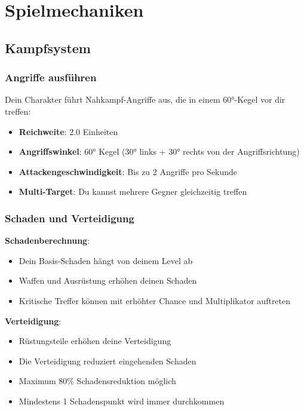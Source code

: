 \documentclass[
  a4paper,
  11pt,
  ngerman,
  parskip=half,
  bibliography=totoc,
  listof=totoc
]{scrreprt}
\begin{document}

\chapter{Spielmechaniken}

\section{Kampfsystem}

\subsection{Angriffe ausführen}

Dein Charakter führt Nahkampf-Angriffe aus, die in einem 60°-Kegel vor dir treffen:

\begin{itemize}
    \item \textbf{Reichweite}: 2.0 Einheiten
    \item \textbf{Angriffswinkel}: 60° Kegel (30° links + 30° rechts von der Angriffsrichtung)
    \item \textbf{Attackengeschwindigkeit}: Bis zu 2 Angriffe pro Sekunde
    \item \textbf{Multi-Target}: Du kannst mehrere Gegner gleichzeitig treffen
\end{itemize}

\subsection{Schaden und Verteidigung}

\textbf{Schadenberechnung}:
\begin{itemize}
    \item Dein Basis-Schaden hängt von deinem Level ab
    \item Waffen und Ausrüstung erhöhen deinen Schaden
    \item Kritische Treffer können mit erhöhter Chance und Multiplikator auftreten
\end{itemize}

\textbf{Verteidigung}:
\begin{itemize}
    \item Rüstungsteile erhöhen deine Verteidigung
    \item Die Verteidigung reduziert eingehenden Schaden
    \item Maximum 80\% Schadensreduktion möglich
    \item Mindestens 1 Schadenspunkt wird immer durchkommen
\end{itemize}
\end{document}
